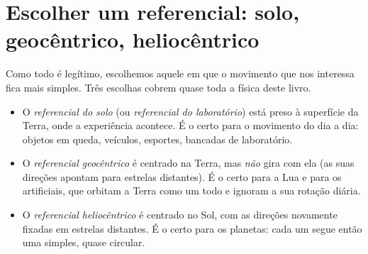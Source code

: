 \section{Escolher um referencial: solo, geocêntrico, heliocêntrico}

Como todo  é legítimo, escolhemos aquele em que o movimento
que nos interessa fica mais simples. Três escolhas cobrem quase toda a
física deste livro.

\begin{definition}\label{def:g10:relative-motion:frames}
\begin{itemize}
  \item O \emph{referencial do solo} (ou
        \emph{referencial do laboratório}) está preso à superfície da Terra, onde a
        experiência acontece. É o  certo para o movimento do
        dia a dia: objetos em queda, veículos, esportes, bancadas de
        laboratório.
  \item O \emph{referencial geocêntrico} é
        centrado na Terra, mas \emph{não} gira com ela (as suas direções
        apontam para estrelas distantes). É o  certo para a
        Lua e para os  artificiais, que orbitam a Terra como um
        todo e ignoram a sua rotação diária.
  \item O \emph{referencial heliocêntrico} é centrado no Sol, com as direções novamente
        fixadas em estrelas distantes. É o  certo para os
        planetas: cada um segue então uma  simples, quase circular.
\end{itemize}
\end{definition}

